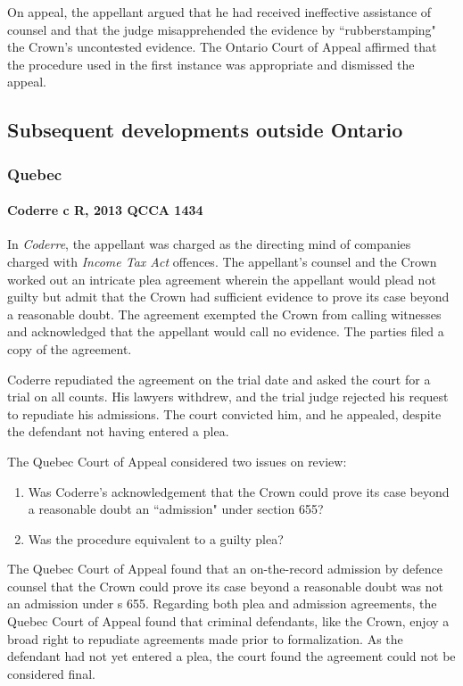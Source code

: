 On appeal, the appellant argued that he had received ineffective assistance of counsel and that the judge misapprehended the evidence by ``rubberstamping" the Crown's uncontested evidence. The Ontario Court of Appeal affirmed that the procedure used in the first instance was appropriate and dismissed the appeal.

\subsection{Subsequent developments outside Ontario}
\subsubsection{Quebec}
\paragraph{Coderre c R, 2013 QCCA 1434\\}
In \textit{Coderre}, the appellant was charged as the directing mind of companies charged with \textit{Income Tax Act} offences. The appellant's counsel and the Crown worked out an intricate plea agreement wherein the appellant would plead not guilty but admit that the Crown had sufficient evidence to prove its case beyond a reasonable doubt. The agreement exempted the Crown from calling witnesses and acknowledged that the appellant would call no evidence. The parties filed a copy of the agreement.

Coderre repudiated the agreement on the trial date and asked the court for a trial on all counts. His lawyers withdrew, and the trial judge rejected his request to repudiate his admissions. The court convicted him, and he appealed, despite the defendant not having entered a plea.

The Quebec Court of Appeal considered two issues on review:
\begin{enumerate}
    \item Was Coderre's acknowledgement that the Crown could prove its case beyond a reasonable doubt an ``admission" under section 655?
    \item Was the procedure equivalent to a guilty plea?
\end{enumerate}

The Quebec Court of Appeal found that an on-the-record admission by defence counsel that the Crown could prove its case beyond a reasonable doubt was not an admission under s 655. Regarding both plea and admission agreements, the Quebec Court of Appeal found that criminal defendants, like the Crown, enjoy a broad right to repudiate agreements made prior to formalization. As the defendant had not yet entered a plea, the court found the agreement could not be considered final.


